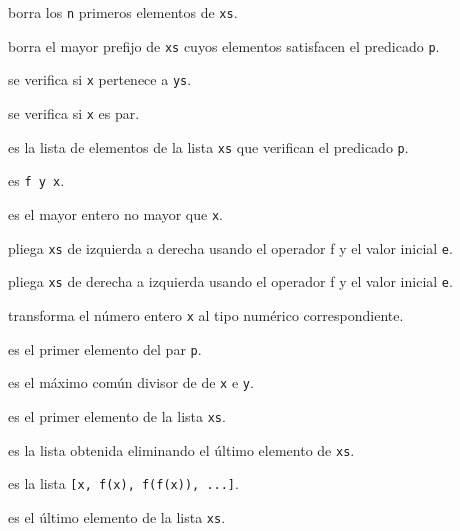 \begin{enumerate*}
\item {} borra los \verb|n| primeros elementos de \verb|xs|.
\item {} borra el mayor prefijo de \verb|xs| cuyos
  elementos satisfacen el predicado \verb|p|.
\item {} se verifica si \verb|x| pertenece a \verb|ys|.
\item {} se verifica si \verb|x| es par.
\item {} es la lista de elementos de la lista \verb|xs| que
  verifican el predicado \verb|p|. 
\item {} es \verb|f y x|.
\item {} es el mayor entero no mayor que \verb|x|.
\item {} pliega \verb|xs| de izquierda a derecha
  usando el operador f y el valor inicial \verb|e|.
\item {} pliega \verb|xs| de derecha a izquierda
  usando el operador f y el valor inicial \verb|e|. 
\item {} transforma el número entero \verb|x| al tipo
  numérico correspondiente. 
\item {} es el primer elemento del par \verb|p|.
\item {} es el máximo común divisor de de \verb|x| e \verb|y|.
\item {} es el primer elemento de la lista \verb|xs|.
\item {} es la lista obtenida eliminando el último elemento de
  \verb|xs|. 
\item {} es la lista \verb|[x, f(x), f(f(x)), ...]|.
\item {} es el último elemento de la lista \verb|xs|.

\end{enumerate*}
